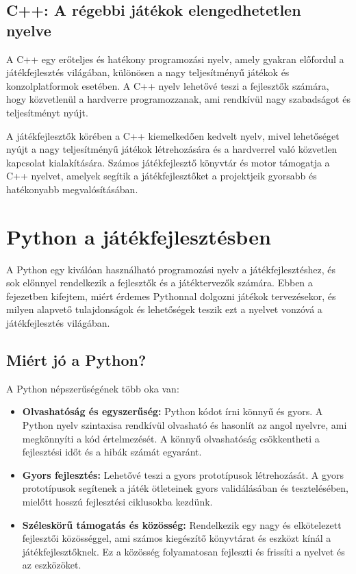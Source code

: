 \subsection{C++: A régebbi játékok elengedhetetlen nyelve}

 A C++ \cite{cpp-doc, cpp} egy erőteljes és hatékony programozási nyelv, amely gyakran előfordul a játékfejlesztés világában, különösen a nagy teljesítményű játékok és konzolplatformok esetében. A C++ nyelv lehetővé teszi a fejlesztők számára, hogy közvetlenül a hardverre programozzanak, ami rendkívül nagy szabadságot és teljesítményt nyújt.

A játékfejlesztők körében a C++ kiemelkedően kedvelt nyelv, mivel lehetőséget nyújt a nagy teljesítményű játékok létrehozására és a hardverrel való közvetlen kapcsolat kialakítására. Számos játékfejlesztő könyvtár és motor támogatja a C++ nyelvet, amelyek segítik a játékfejlesztőket a projektjeik gyorsabb és hatékonyabb megvalósításában.


\section{Python a játékfejlesztésben}

 A Python \cite{python} egy kiválóan használható programozási nyelv a játékfejlesztéshez, és sok előnnyel rendelkezik a fejlesztők és a játéktervezők számára. Ebben a fejezetben kifejtem, miért érdemes Pythonnal dolgozni játékok tervezésekor, és milyen alapvető tulajdonságok és lehetőségek teszik ezt a nyelvet vonzóvá a játékfejlesztés világában.

\subsection{Miért jó a Python?}
A Python népszerűségének \cite{why-is-python} több oka van: 

\begin{itemize}
\item    \textbf{Olvashatóság és egyszerűség:}
    Python kódot írni könnyű és gyors. A Python nyelv szintaxisa rendkívül olvasható és hasonlít az angol nyelvre, ami megkönnyíti a kód értelmezését. A könnyű olvashatóság csökkentheti a fejlesztési időt és a hibák számát egyaránt. 
    
\item    \textbf{Gyors fejlesztés:}
    Lehetővé teszi a gyors prototípusok létrehozását. A gyors prototípusok segítenek a játék ötleteinek gyors validálásában és tesztelésében, mielőtt hosszú fejlesztési ciklusokba kezdünk.
    
\item    \textbf{Széleskörű támogatás és közösség:}
    Rendelkezik egy nagy és elkötelezett fejlesztői közösséggel, ami számos kiegészítő könyvtárat és eszközt kínál a játékfejlesztőknek. Ez a közösség folyamatosan fejleszti és frissíti a nyelvet és az eszközöket.
\end{itemize}


